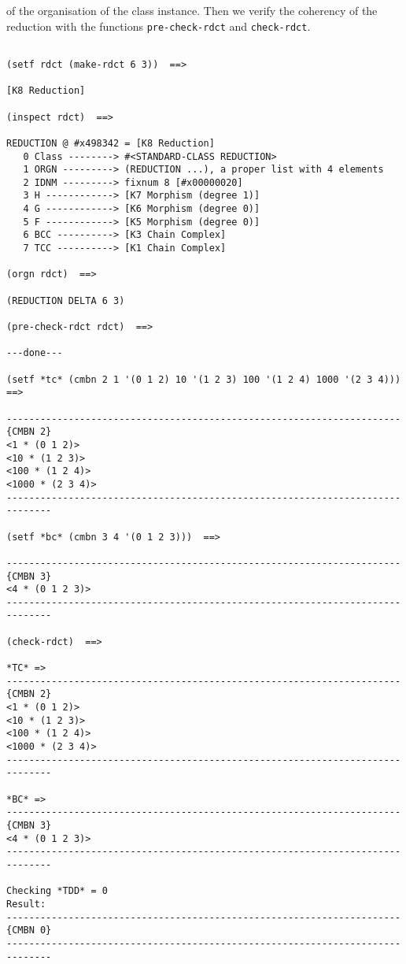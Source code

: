 of the organisation of the class instance. Then we verify the coherency of the reduction with the functions
{\tt pre-check-rdct} and {\tt check-rdct}.
{\footnotesize\begin{verbatim}

(setf rdct (make-rdct 6 3))  ==>

[K8 Reduction]

(inspect rdct)  ==>

REDUCTION @ #x498342 = [K8 Reduction]
   0 Class --------> #<STANDARD-CLASS REDUCTION>
   1 ORGN ---------> (REDUCTION ...), a proper list with 4 elements
   2 IDNM ---------> fixnum 8 [#x00000020]
   3 H ------------> [K7 Morphism (degree 1)]
   4 G ------------> [K6 Morphism (degree 0)]
   5 F ------------> [K5 Morphism (degree 0)]
   6 BCC ----------> [K3 Chain Complex]
   7 TCC ----------> [K1 Chain Complex]

(orgn rdct)  ==>

(REDUCTION DELTA 6 3)

(pre-check-rdct rdct)  ==>

---done---

(setf *tc* (cmbn 2 1 '(0 1 2) 10 '(1 2 3) 100 '(1 2 4) 1000 '(2 3 4)))  ==>

----------------------------------------------------------------------{CMBN 2}
<1 * (0 1 2)>
<10 * (1 2 3)>
<100 * (1 2 4)>
<1000 * (2 3 4)>
------------------------------------------------------------------------------

(setf *bc* (cmbn 3 4 '(0 1 2 3)))  ==>

----------------------------------------------------------------------{CMBN 3}
<4 * (0 1 2 3)>
------------------------------------------------------------------------------

(check-rdct)  ==>

*TC* => 
----------------------------------------------------------------------{CMBN 2}
<1 * (0 1 2)>
<10 * (1 2 3)>
<100 * (1 2 4)>
<1000 * (2 3 4)>
------------------------------------------------------------------------------

*BC* => 
----------------------------------------------------------------------{CMBN 3}
<4 * (0 1 2 3)>
------------------------------------------------------------------------------

Checking *TDD* = 0
Result: 
----------------------------------------------------------------------{CMBN 0}
------------------------------------------------------------------------------


\end{verbatim}}
